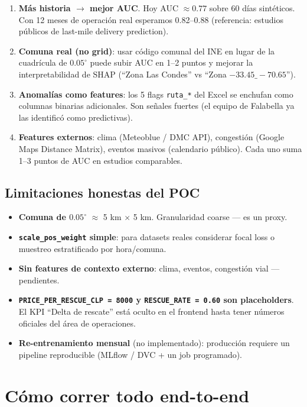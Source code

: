 \documentclass[11pt,a4paper]{article}
\begin{document}
\begin{enumerate}
  \item \textbf{Más historia $\rightarrow$ mejor AUC}. Hoy AUC $\approx 0.77$ sobre 60 días sintéticos. Con 12 meses de operación real esperamos 0.82--0.88 (referencia: estudios públicos de last-mile delivery prediction).
  \item \textbf{Comuna real (no grid)}: usar código comunal del INE en lugar de la cuadrícula de $0.05^{\circ}$ puede subir AUC en 1--2 puntos y mejorar la interpretabilidad de SHAP (``Zona Las Condes'' vs ``Zona $-33.45\_-70.65$'').
  \item \textbf{Anomalías como features}: los 5 flags \texttt{ruta\_*} del Excel se enchufan como columnas binarias adicionales. Son señales fuertes (el equipo de Falabella ya las identificó como predictivas).
  \item \textbf{Features externos}: clima (Meteoblue / DMC API), congestión (Google Maps Distance Matrix), eventos masivos (calendario público). Cada uno suma 1--3 puntos de AUC en estudios comparables.
\end{enumerate}

\subsection{Limitaciones honestas del POC}

\begin{itemize}
  \item \textbf{Comuna de $0.05^{\circ}$} $\approx$ 5 km $\times$ 5 km. Granularidad coarse --- es un proxy.
  \item \textbf{\texttt{scale\_pos\_weight} simple}: para datasets reales considerar focal loss o muestreo estratificado por hora/comuna.
  \item \textbf{Sin features de contexto externo}: clima, eventos, congestión vial --- pendientes.
  \item \textbf{\texttt{PRICE\_PER\_RESCUE\_CLP = 8000} y \texttt{RESCUE\_RATE = 0.60} son placeholders}. El KPI ``Delta de rescate'' está oculto en el frontend hasta tener números oficiales del área de operaciones.
  \item \textbf{Re-entrenamiento mensual} (no implementado): producción requiere un pipeline reproducible (MLflow / DVC + un job programado).
\end{itemize}

\section{Cómo correr todo end-to-end}
\end{document}
